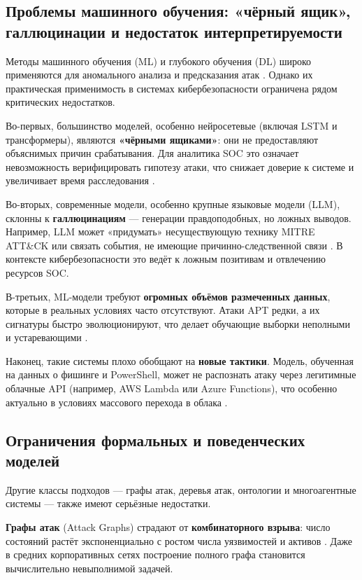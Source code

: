 \subsection{Проблемы машинного обучения: «чёрный ящик», галлюцинации и недостаток интерпретируемости}

Методы машинного обучения (ML) и глубокого обучения (DL) широко применяются для аномального анализа и предсказания атак \cite{Shu2018, Sommer2010}. Однако их практическая применимость в системах кибербезопасности ограничена рядом критических недостатков.

Во-первых, большинство моделей, особенно нейросетевые (включая LSTM и трансформеры), являются \textbf{«чёрными ящиками»}: они не предоставляют объяснимых причин срабатывания. Для аналитика SOC это означает невозможность верифицировать гипотезу атаки, что снижает доверие к системе и увеличивает время расследования \cite{Rudin2019}.

Во-вторых, современные модели, особенно крупные языковые модели (LLM), склонны к \textbf{галлюцинациям} — генерации правдоподобных, но ложных выводов. Например, LLM может «придумать» несуществующую технику MITRE ATT\&CK или связать события, не имеющие причинно-следственной связи \cite{Bommasani2021}. В контексте кибербезопасности это ведёт к ложным позитивам и отвлечению ресурсов SOC.

В-третьих, ML-модели требуют \textbf{огромных объёмов размеченных данных}, которые в реальных условиях часто отсутствуют. Атаки APT редки, а их сигнатуры быстро эволюционируют, что делает обучающие выборки неполными и устаревающими \cite{Ring2019}.

Наконец, такие системы плохо обобщают на \textbf{новые тактики}. Модель, обученная на данных о фишинге и PowerShell, может не распознать атаку через легитимные облачные API (например, AWS Lambda или Azure Functions), что особенно актуально в условиях массового перехода в облака \cite{MITRE2023}.

\subsection{Ограничения формальных и поведенческих моделей}

Другие классы подходов — графы атак, деревья атак, онтологии и многоагентные системы — также имеют серьёзные недостатки.

\textbf{Графы атак} (Attack Graphs) страдают от \textbf{комбинаторного взрыва}: число состояний растёт экспоненциально с ростом числа уязвимостей и активов \cite{Sheyner2002}. Даже в средних корпоративных сетях построение полного графа становится вычислительно невыполнимой задачей.

